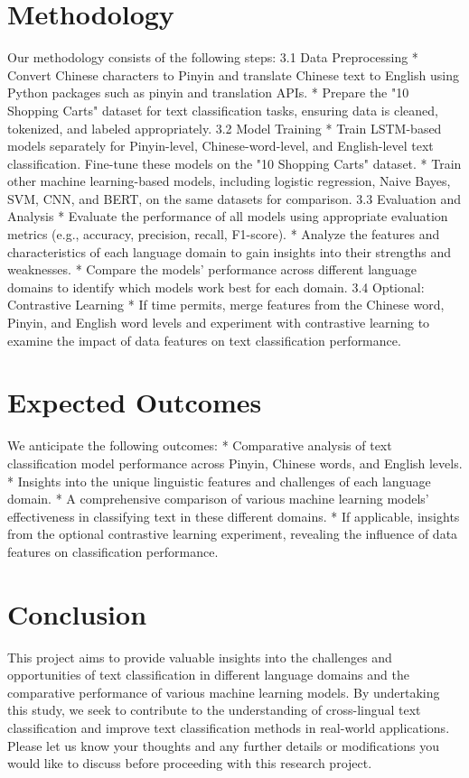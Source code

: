 \documentclass[12pt, a4paper]{extarticle}
\begin{document}
\section{Methodology}
Our methodology consists of the following steps:
3.1 Data Preprocessing
* 		Convert Chinese characters to Pinyin and translate Chinese text to English using Python packages such as pinyin and translation APIs.
* 		Prepare the "10 Shopping Carts" dataset for text classification tasks, ensuring data is cleaned, tokenized, and labeled appropriately.
3.2 Model Training
* 		Train LSTM-based models separately for Pinyin-level, Chinese-word-level, and English-level text classification. Fine-tune these models on the "10 Shopping Carts" dataset.
* 		Train other machine learning-based models, including logistic regression, Naive Bayes, SVM, CNN, and BERT, on the same datasets for comparison.
3.3 Evaluation and Analysis
* 		Evaluate the performance of all models using appropriate evaluation metrics (e.g., accuracy, precision, recall, F1-score).
* 		Analyze the features and characteristics of each language domain to gain insights into their strengths and weaknesses.
* 		Compare the models' performance across different language domains to identify which models work best for each domain.
3.4 Optional: Contrastive Learning
* 		If time permits, merge features from the Chinese word, Pinyin, and English word levels and experiment with contrastive learning to examine the impact of data features on text classification performance.

\section{Expected Outcomes}

We anticipate the following outcomes:
* Comparative analysis of text classification model performance across Pinyin, Chinese words, and English levels.
* Insights into the unique linguistic features and challenges of each language domain.
* A comprehensive comparison of various machine learning models' effectiveness in classifying text in these different domains.
* If applicable, insights from the optional contrastive learning experiment, revealing the influence of data features on classification performance.

\section{Conclusion}

This project aims to provide valuable insights into the challenges and opportunities of text classification in different language domains and the comparative performance of various machine learning models. By undertaking this study, we seek to contribute to the understanding of cross-lingual text classification and improve text classification methods in real-world applications.
Please let us know your thoughts and any further details or modifications you would like to discuss before proceeding with this research project.
\end{document}
